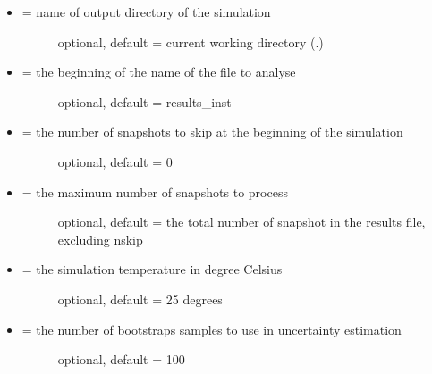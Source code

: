 \documentclass[letterpaper,10pt,english]{sphinxmanual}
\begin{document}
\begin{itemize}
\item {} \begin{description}
\item[{ = name of output directory of the simulation}] \leavevmode
optional, default = current working directory (.)

\end{description}

\item {} \begin{description}
\item[{ = the beginning of the name of the file to analyse}] \leavevmode
optional, default = results\_inst

\end{description}

\item {} \begin{description}
\item[{ = the number of snapshots to skip at the beginning of the simulation}] \leavevmode
optional, default = 0

\end{description}

\item {} \begin{description}
\item[{ = the maximum number of snapshots to process}] \leavevmode
optional, default = the total number of snapshot in the results file, excluding nskip

\end{description}

\item {} \begin{description}
\item[{ = the simulation temperature in degree Celsius}] \leavevmode
optional, default = 25 degrees

\end{description}

\item {} \begin{description}
\item[{ = the number of bootstraps samples to use in uncertainty estimation}] \leavevmode
optional, default = 100


\end{description}
\end{itemize}
\end{document}
